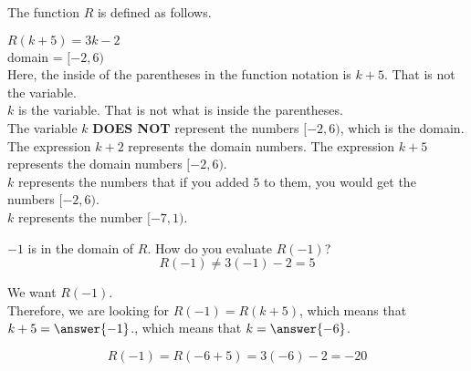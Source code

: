 \documentclass{ximera}
\begin{document}
\begin{example}

The function $R$ is defined as follows.

$R(k + 5) = 3k - 2$ \\
domain = $[-2, 6)$ \\


Here, the inside of the parentheses in the function notation is $k + 5$.  That is not the variable. \\


$k$ is the variable.  That is not what is inside the parentheses.\\


The variable $k$ \textbf{DOES NOT} represent the numbers $[-2, 6)$, which is the domain. \\


The expression $k + 2$ represents the domain numbers.   The expression $k + 5$ represents the domain numbers $[-2, 6)$. \\


$k$ represents the numbers that if you added $5$ to them, you would get the numbers $[-2, 6)$.\\


$k$ represents the number $[-7, 1)$.



\begin{question}


$-1$ is in the domain of $R$. How do you evaluate $R(-1)$? \\

\[
R(-1) \ne 3 (-1) - 2 = 5
\]



We want $R(-1)$. \\

Therefore, we are looking for $R(-1) = R(k + 5)$, which means that $k + 5 = \answer{-1}$., which means that $k = \answer{-6}$.


\[
R(-1) = R(-6 + 5) = 3(-6) - 2 = -20
\]



\end{question}

\end{example}
\end{document}
